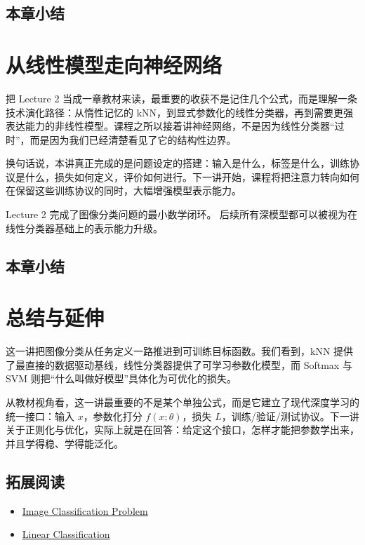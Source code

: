 \documentclass[a4paper]{article}
\begin{document}
\subsection{本章小结}

\section{从线性模型走向神经网络}
把 Lecture 2 当成一章教材来读，最重要的收获不是记住几个公式，而是理解一条技术演化路径：从惰性记忆的 kNN，到显式参数化的线性分类器，再到需要更强表达能力的非线性模型。课程之所以接着讲神经网络，不是因为线性分类器“过时”，而是因为我们已经清楚看见了它的结构性边界。

换句话说，本讲真正完成的是问题设定的搭建：输入是什么，标签是什么，训练协议是什么，损失如何定义，评价如何进行。下一讲开始，课程将把注意力转向如何在保留这些训练协议的同时，大幅增强模型表示能力。

Lecture 2 完成了图像分类问题的最小数学闭环。
后续所有深模型都可以被视为在线性分类器基础上的表示能力升级。
\subsection{本章小结}

\section{总结与延伸}
这一讲把图像分类从任务定义一路推进到可训练目标函数。我们看到，kNN 提供了最直接的数据驱动基线，线性分类器提供了可学习参数化模型，而 Softmax 与 SVM 则把“什么叫做好模型”具体化为可优化的损失。

从教材视角看，这一讲最重要的不是某个单独公式，而是它建立了现代深度学习的统一接口：输入 $x$，参数化打分 $f(x;\theta)$，损失 $L$，训练/验证/测试协议。下一讲关于正则化与优化，实际上就是在回答：给定这个接口，怎样才能把参数学出来，并且学得稳、学得能泛化。

\subsection{拓展阅读}
\begin{itemize}
\item \href{https://cs231n.github.io/classification/}{Image Classification Problem}
\item \href{https://cs231n.github.io/linear-classify/}{Linear Classification}
\end{itemize}


\end{document}
